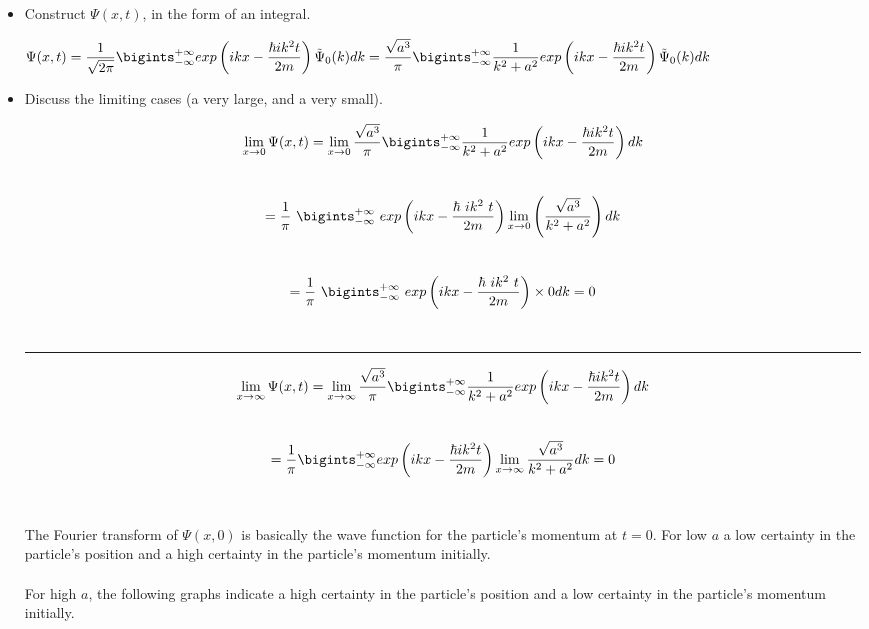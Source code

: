 \documentclass[fleqn]{article}
\begin{document}
\begin{itemize}
    \item Construct $\Psi(x,t)$, in the form of an integral.
    
      \textcolor{hwColor}{
        $
          \Psi(x,t)=\dfrac{1}{\sqrt{2\pi}} \bigints_{-\infty}^{+\infty} exp\left(ikx-\dfrac{\hbar ik^2t}{2m}\right) \tilde{\Psi}_0(k) dk \\
          \\
          =\dfrac{\sqrt{a^3}}{\pi} \bigints_{-\infty}^{+\infty} \dfrac{1}{k^2+a^2}exp\left(ikx-\dfrac{\hbar ik^2t}{2m}\right) \tilde{\Psi}_0(k) dk
        $
      }

    \item Discuss the limiting cases (a very large, and a very small).

      \textcolor{hwColor}{
        \[\lim_{x\to 0} \Psi(x,t)=\lim_{x\to 0} \dfrac{\sqrt{a^3}}{\pi} \bigints_{-\infty}^{+\infty} \dfrac{1}{k^2+a^2} exp\left(ikx-\dfrac{\hbar ik^2 t}{2m}\right) dk\] \\
        \[=\dfrac{1}{\pi} \bigints_{-\infty}^{+\infty} exp\left(ikx-\dfrac{\hbar ik^2 t}{2m}\right) \lim_{x\to 0} \left(\dfrac{\sqrt{a^3}}{k^2+a^2}\right) dk\] \\
        \[=\dfrac{1}{\pi} \bigints_{-\infty}^{+\infty} exp\left(ikx-\dfrac{\hbar ik^2 t}{2m}\right) \times 0 dk=0\] \\
      }

      \rule{15cm}{1pt}

      \textcolor{hwColor}{
        \[\lim_{x\to\infty} \Psi(x,t)=\lim_{x\to\infty} \dfrac{\sqrt{a^3}}{\pi} \bigints_{-\infty}^{+\infty} \dfrac{1}{k^2+a^2} exp\left(ikx-\dfrac{\hbar ik^2 t}{2m}\right) dk\] \\
        \[=\dfrac{1}{\pi} \bigints_{-\infty}^{+\infty} exp\left(ikx-\dfrac{\hbar ik^2 t}{2m}\right)  \lim_{x \to \infty} \dfrac{\sqrt{a^3}}{k^2+a^2}  dk=0\] \\
        \\
        The Fourier transform of $\Psi(x,0)$ is basically the wave function for the particle’s momentum at $t=0$. 
        For low $a$ a low certainty in the particle’s position and a high certainty in the particle’s momentum initially. \\
        \\
        For high $a$, the following graphs indicate a high certainty in the particle’s position and a low certainty in the particle’s momentum initially.
      }

  \end{itemize}
\end{document}
